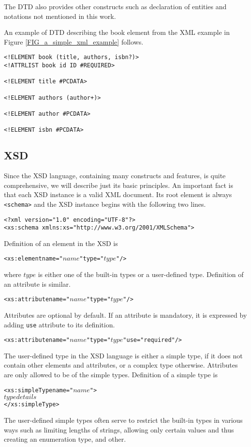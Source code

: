 The DTD also provides other constructs such as declaration of entities and notations not mentioned in this work.

An example of DTD describing the book element from the XML example in Figure \ref{FIG_a_simple_xml_example} follows.

\begin{verbatim}
<!ELEMENT book (title, authors, isbn?)>
<!ATTRLIST book id ID #REQUIRED>

<!ELEMENT title #PCDATA>

<!ELEMENT authors (author+)>

<!ELEMENT author #PCDATA>

<!ELEMENT isbn #PCDATA>
\end{verbatim}


\subsection{XSD}
Since the XSD language, containing many constructs and features, is quite comprehensive, we will describe just its basic principles. An important fact is that each XSD instance is a valid XML document. Its root element is always \texttt{<schema>} and the XSD instance begins with the following two lines.

\begin{verbatim}
<?xml version="1.0" encoding="UTF-8"?>
<xs:schema xmlns:xs="http://www.w3.org/2001/XMLSchema">
\end{verbatim}

Definition of an element in the XSD is
\begin{alltt}
<xs:element name="\(name\)" type="\(type\)"/>
\end{alltt}
where $type$ is either one of the built-in types or a user-defined type. Definition of an attribute is similar.
\begin{alltt}
<xs:attribute name="\(name\)" type="\(type\)"/>
\end{alltt}
Attributes are optional by default. If an attribute is mandatory, it is expressed by adding \texttt{use} attribute to its definition.
\begin{alltt}
<xs:attribute name="\(name\)" type="\(type\)" use="required"/>
\end{alltt}

The user-defined type in the XSD language is either a simple type, if it does not contain other elements and attributes, or a complex type otherwise. Attributes are only allowed to be of the simple types. Definition of a simple type is
\begin{alltt}
<xs:simpleType name="\(name\)">
   \(type details\)
</xs:simpleType>
\end{alltt}
The user-defined simple types often serve to restrict the built-in types in various ways such as limiting lengths of strings, allowing only certain values and thus creating an enumeration type, and other.

